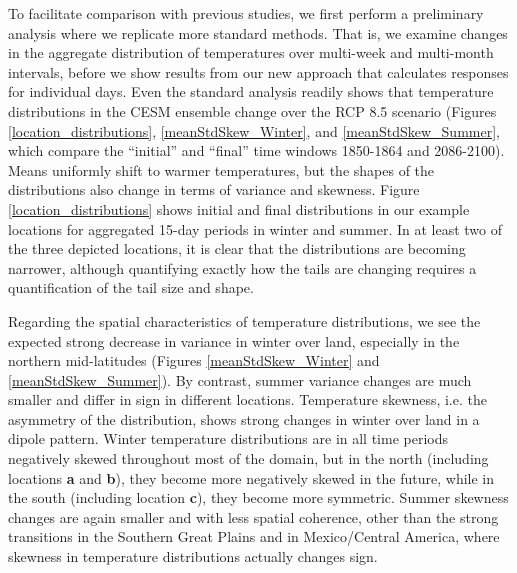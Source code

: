 \documentclass{ametsoc}
\begin{document}
To facilitate comparison with previous studies, we first perform a preliminary analysis where we replicate more standard methods. That is, we examine changes in the aggregate distribution of temperatures over multi-week and multi-month intervals, before we show results from our new approach that calculates responses for individual days. Even the standard analysis readily shows that temperature distributions in the CESM ensemble change over the RCP 8.5 scenario (Figures \ref{location_distributions}, \ref{meanStdSkew_Winter}, and \ref{meanStdSkew_Summer}, which compare the “initial” and “final” time windows 1850-1864 and 2086-2100). Means uniformly shift to warmer temperatures, but the shapes of the distributions also change in terms of variance and skewness. Figure \ref{location_distributions} shows initial and final distributions in our example locations for aggregated 15-day periods in winter and summer. In at least two of the three depicted locations, it is clear that the distributions are becoming narrower, although quantifying exactly how the tails are changing requires a quantification of the tail size and shape.

Regarding the spatial characteristics of temperature distributions, we see the expected strong decrease in variance in winter over land, especially in the northern mid-latitudes (Figures \ref{meanStdSkew_Winter} and \ref{meanStdSkew_Summer}). By contrast, summer variance changes are much smaller and differ in sign in different locations. Temperature skewness, i.e. the asymmetry of the distribution, shows strong changes in winter over land in a dipole pattern. Winter temperature distributions are in all time periods negatively skewed throughout most of the domain, but in the north (including locations \textbf{a} and \textbf{b}), they become more negatively skewed in the future, while in the south (including location \textbf{c}), they become more symmetric.  Summer skewness changes are again smaller and with less spatial coherence, other than the strong transitions in the Southern Great Plains and in Mexico/Central America, where 
skewness in temperature distributions actually changes sign. 
 

\end{document}
